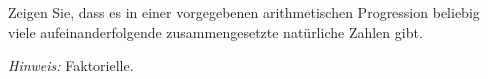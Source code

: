
\begin{exercise}

Zeigen Sie, dass es in einer vorgegebenen arithmetischen Progression
beliebig viele aufeinanderfolgende zusammengesetzte natürliche
Zahlen gibt.

\textit{Hinweis:} Faktorielle.

\end{exercise}


\begin{solution}

\phantom{}

\end{solution}

